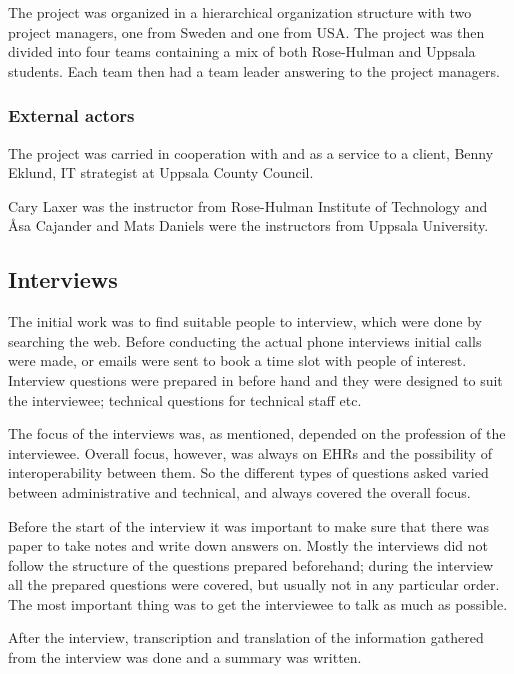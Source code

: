 \documentclass[14pt]{article}
\begin{document}
The project was organized in a hierarchical organization structure with two project managers, one from Sweden and one from USA. The project was then divided into four teams containing a mix of both Rose-Hulman and Uppsala students. Each team then had a team leader answering to the project managers.

\subsubsection{External actors}
The project was carried in cooperation with and as a service to a client, Benny Eklund, IT strategist at Uppsala County Council.

Cary Laxer was the instructor from Rose-Hulman Institute of Technology and Åsa Cajander and Mats Daniels were the instructors from Uppsala University.

\subsection{Interviews}

The initial work was to find suitable people to interview, which were done by searching the web. Before conducting the actual phone interviews initial calls were made, or emails were sent to book a time slot with people of interest. Interview questions were prepared in before hand and they were designed to suit the interviewee; technical questions for technical staff etc. 

The focus of the interviews was, as mentioned, depended on the profession of the interviewee. Overall focus, however, was always on \glspl{EHR} and the possibility of interoperability between them. So the different types of questions asked varied between administrative and technical, and always covered the overall focus. 

Before the start of the interview it was important to make sure that there was paper to take notes and write down answers on. Mostly the interviews did not follow the structure of the questions prepared beforehand; during the interview all the prepared questions were covered, but usually not in any particular order. The most important thing was to get the interviewee to talk as much as possible.

After the interview, transcription and translation of the information gathered from the interview was done and a summary was written.
\end{document}
